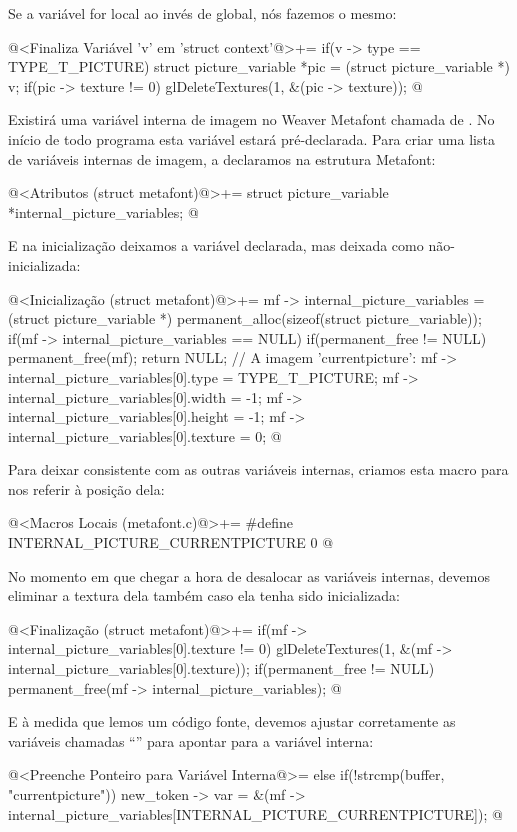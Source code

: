 Se a variável for local ao invés de global, nós fazemos o mesmo:

\iniciocodigo
@<Finaliza Variável 'v' em 'struct context'@>+=
if(v -> type == TYPE_T_PICTURE){
  struct picture_variable *pic = (struct picture_variable *) v;
  if(pic -> texture != 0)
    glDeleteTextures(1, &(pic -> texture));
}
@
\fimcodigo

Existirá uma variável interna de imagem no Weaver Metafont chamada
de . No início de todo programa esta
variável estará pré-declarada. Para criar uma lista de variáveis
internas de imagem, a declaramos na estrutura Metafont:

\iniciocodigo
@<Atributos (struct metafont)@>+=
struct picture_variable *internal_picture_variables;
@
\fimcodigo

E na inicialização deixamos a variável 
declarada, mas deixada como não-inicializada:

\iniciocodigo
@<Inicialização (struct metafont)@>+=
mf -> internal_picture_variables = (struct picture_variable *)
                                   permanent_alloc(sizeof(struct picture_variable));
if(mf -> internal_picture_variables == NULL){
  if(permanent_free != NULL)
    permanent_free(mf);
  return NULL;
}
// A imagem 'currentpicture':
mf -> internal_picture_variables[0].type = TYPE_T_PICTURE;
mf -> internal_picture_variables[0].width = -1;
mf -> internal_picture_variables[0].height = -1;
mf -> internal_picture_variables[0].texture = 0;
@
\fimcodigo

Para deixar consistente com as outras variáveis internas, criamos esta
macro para nos referir à posição dela:

\iniciocodigo
@<Macros Locais (metafont.c)@>+=
#define INTERNAL_PICTURE_CURRENTPICTURE 0
@
\fimcodigo

No momento em que chegar a hora de desalocar as variáveis internas,
devemos eliminar a textura dela também caso ela tenha sido
inicializada:

\iniciocodigo
@<Finalização (struct metafont)@>+=
if(mf -> internal_picture_variables[0].texture != 0)
  glDeleteTextures(1, &(mf -> internal_picture_variables[0].texture));
if(permanent_free != NULL)
  permanent_free(mf -> internal_picture_variables);
@
\fimcodigo

E à medida que lemos um código fonte, devemos ajustar corretamente as
variáveis chamadas ``'' para apontar para a
variável interna:

\iniciocodigo
@<Preenche Ponteiro para Variável Interna@>=
else if(!strcmp(buffer, "currentpicture"))
  new_token -> var =
          &(mf -> internal_picture_variables[INTERNAL_PICTURE_CURRENTPICTURE]);
@
\fimcodigo

